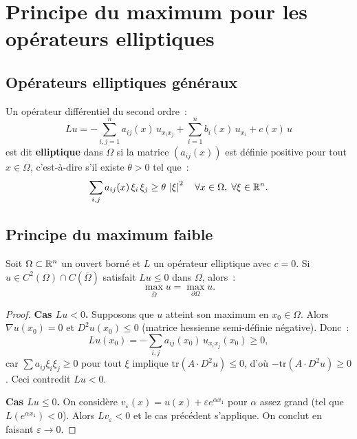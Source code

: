 \section{Principe du maximum pour les op\'erateurs elliptiques}

\subsection{Op\'erateurs elliptiques g\'en\'eraux}

\begin{definition}
Un op\'erateur diff\'erentiel du second ordre~:
\begin{equation}\label{eq:operateur_elliptique}
    Lu = -\sum_{i,j=1}^{n} a_{ij}(x)\, u_{x_i x_j}
    + \sum_{i=1}^{n} b_i(x)\, u_{x_i} + c(x)\, u
\end{equation}
est dit \textbf{elliptique} dans $\Omega$ si la matrice $(a_{ij}(x))$ est
d\'efinie positive pour tout $x \in \Omega$, c'est-\`a-dire s'il existe
$\theta > 0$ tel que~:
\[
    \sum_{i,j} a_{ij}(x)\, \xi_i\, \xi_j \geq \theta\, \left| \xi \right|^2
    \quad \forall x \in \Omega, \; \forall \xi \in \mathbb{R}^n.
\]
\end{definition}

\subsection{Principe du maximum faible}

\begin{theoreme}[Principe du maximum faible --- cas $c = 0$]
\label{thm:max_faible_elliptique}
Soit $\Omega \subset \mathbb{R}^n$ un ouvert born\'e et $L$ un op\'erateur elliptique
avec $c = 0$. Si $u \in C^2(\Omega) \cap C(\overline{\Omega})$ satisfait
$Lu \leq 0$ dans $\Omega$, alors~:
\begin{equation}\label{eq:max_faible}
    \max_{\overline{\Omega}} u = \max_{\partial\Omega} u.
\end{equation}
\end{theoreme}

\begin{proof}
\textbf{Cas $Lu < 0$.} Supposons que $u$ atteint son maximum en
$x_0 \in \Omega$. Alors $\nabla u(x_0) = 0$ et $D^2u(x_0) \leq 0$
(matrice hessienne semi-d\'efinie n\'egative). Donc~:
\[
    Lu(x_0) = -\sum_{i,j} a_{ij}(x_0)\, u_{x_ix_j}(x_0) \geq 0,
\]
car $\sum a_{ij} \xi_i\xi_j \geq 0$ pour tout $\xi$ implique
$\mathrm{tr}(A \cdot D^2u) \leq 0$, d'o\`u $-\mathrm{tr}(A \cdot D^2u) \geq 0$.
Ceci contredit $Lu < 0$.

\textbf{Cas $Lu \leq 0$.} On consid\`ere $v_\varepsilon(x) = u(x) + \varepsilon e^{\alpha x_1}$
pour $\alpha$ assez grand (tel que $L(e^{\alpha x_1}) < 0$). Alors
$Lv_\varepsilon < 0$ et le cas pr\'ec\'edent s'applique. On conclut en
faisant $\varepsilon \to 0$.
\end{proof}

